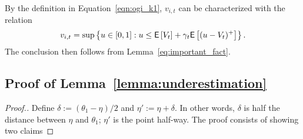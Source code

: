 \begin{myproof}[Proof.]
	By the definition in Equation~\eqref{eqn:ogi_k1}, $v_{i,t}$ can be characterized with the relation 
	\begin{equation*}%
	v_{i,t} = \sup\left\{ u \in [0,1] : u \le \Ee{V_t}  + \gamma_t \Ee{(u - V_t)^+} \right\}.
	\end{equation*}
	The conclusion then follows from Lemma~\ref{eq:important_fact}.
\end{myproof}

\subsection{Proof of Lemma~\ref{lemma:underestimation}} \label{proof:underestimation_proof}
\begin{proof}[Proof.]
	Define $\delta := (\theta_1 - \eta)/2$ and  $\eta' :=  \eta + \delta$. In other words, $\delta$ is half the distance between $\eta$ and $\theta_1$; $\eta'$ is the point half-way. The proof consists of showing two claims
	

\end{proof}
